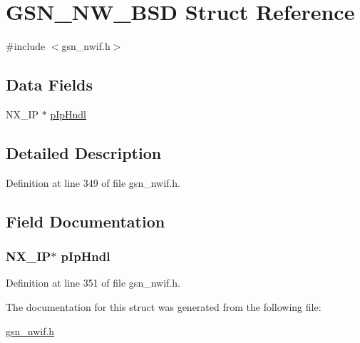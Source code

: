 \hypertarget{a00163}{
\section{GSN\_\-NW\_\-BSD Struct Reference}
\label{a00163}
}


{\ttfamily \#include $<$gsn\_\-nwif.h$>$}

\subsection*{Data Fields}
\begin{DoxyCompactItemize}
\item 
NX\_\-IP $\ast$ \hyperlink{a00163_a5e6c19246ee28d20aff00e797fb7b999}{pIpHndl}
\end{DoxyCompactItemize}


\subsection{Detailed Description}


Definition at line 349 of file gsn\_\-nwif.h.



\subsection{Field Documentation}
\hypertarget{a00163_a5e6c19246ee28d20aff00e797fb7b999}{
\subsubsection[{pIpHndl}]{\setlength{\rightskip}{0pt plus 5cm}NX\_\-IP$\ast$ {\bf pIpHndl}}}
\label{a00163_a5e6c19246ee28d20aff00e797fb7b999}


Definition at line 351 of file gsn\_\-nwif.h.



The documentation for this struct was generated from the following file:\begin{DoxyCompactItemize}
\item 
\hyperlink{a00534}{gsn\_\-nwif.h}\end{DoxyCompactItemize}
